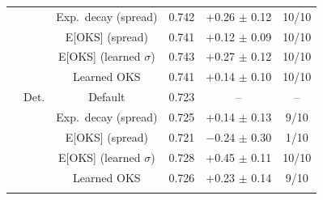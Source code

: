 \begin{tabular}{llcccc}
 &  & Exp.\ decay (spread) & 0.742 & +0.26 $\pm$ 0.12 & 10/10 \\
 &  & E[OKS] (spread) & 0.741 & +0.12 $\pm$ 0.09 & 10/10 \\
 &  & E[OKS] (learned $\sigma$) & 0.743 & +0.27 $\pm$ 0.12 & 10/10 \\
 &  & Learned OKS & 0.741 & +0.14 $\pm$ 0.10 & 10/10 \\
\addlinespace
 & Det. & Default & 0.723 & -- & -- \\
 &  & Exp.\ decay (spread) & 0.725 & +0.14 $\pm$ 0.13 & 9/10 \\
 &  & E[OKS] (spread) & 0.721 & \ensuremath{-}0.24 $\pm$ 0.30 & 1/10 \\
 &  & E[OKS] (learned $\sigma$) & 0.728 & +0.45 $\pm$ 0.11 & 10/10 \\
 &  & Learned OKS & 0.726 & +0.23 $\pm$ 0.14 & 9/10 \\
\addlinespace
\bottomrule
\end{tabular}
